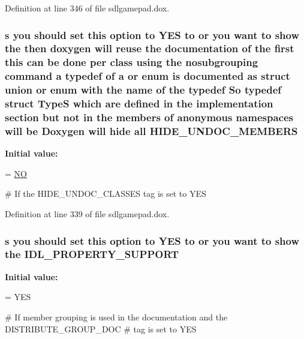 Definition at line 346 of file sdlgamepad.\-dox.

\hypertarget{sdlgamepad_8dox_aa8c460aa75e1350ef6bebbac97c2aeff}{
\subsubsection[{H\-I\-D\-E\-\_\-\-U\-N\-D\-O\-C\-\_\-\-M\-E\-M\-B\-E\-R\-S}]{ {\bf s} you should {\bf set} this option to Y\-E\-S to or you want to show the then doxygen will reuse the documentation of the {\bf first} this can be {\bf done} per class using the nosubgrouping command {\bf a} typedef of {\bf a} or enum is documented as {\bf struct} {\bf union} or enum with the {\bf name} of the typedef So typedef {\bf struct} {\bf Type\-S} which {\bf are} defined {\bf in} the implementation section but {\bf not} {\bf in} the members of anonymous namespaces will be Doxygen will hide all H\-I\-D\-E\-\_\-\-U\-N\-D\-O\-C\-\_\-\-M\-E\-M\-B\-E\-R\-S}}\label{sdlgamepad_8dox_aa8c460aa75e1350ef6bebbac97c2aeff}
{\bfseries Initial value\-:}
\begin{DoxyCode}
= \hyperlink{sdlgamepad_8dox_a0f6a46245280dc38baf9600906aa1393}{NO}

\textcolor{preprocessor}{# If the HIDE\_UNDOC\_CLASSES tag is set to YES}
\end{DoxyCode}


Definition at line 339 of file sdlgamepad.\-dox.

\hypertarget{sdlgamepad_8dox_a09c760dfd058001a9247df20dd282ea2}{
\subsubsection[{I\-D\-L\-\_\-\-P\-R\-O\-P\-E\-R\-T\-Y\-\_\-\-S\-U\-P\-P\-O\-R\-T}]{ {\bf s} you should {\bf set} this option to Y\-E\-S to or you want to show the I\-D\-L\-\_\-\-P\-R\-O\-P\-E\-R\-T\-Y\-\_\-\-S\-U\-P\-P\-O\-R\-T}}\label{sdlgamepad_8dox_a09c760dfd058001a9247df20dd282ea2}
{\bfseries Initial value\-:}
\begin{DoxyCode}
= YES

\textcolor{preprocessor}{# If member grouping is used in the documentation and the DISTRIBUTE\_GROUP\_DOC}
\textcolor{preprocessor}{# tag is set to YES}
\end{DoxyCode}


